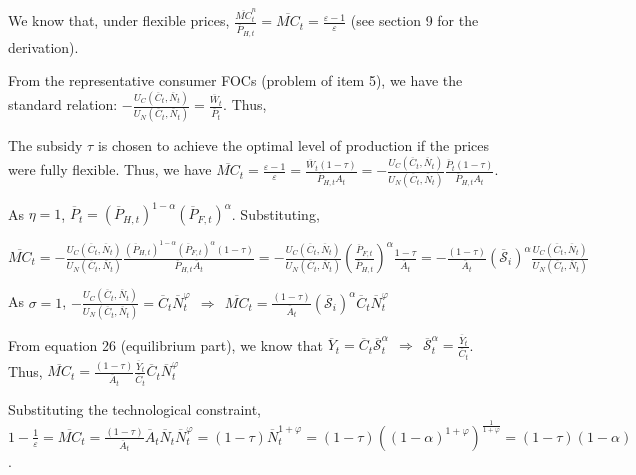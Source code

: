 \documentclass[
]{article}
\begin{document}
We know that, under flexible prices,
\(\displaystyle \frac{\overline{MC}_t^n}{\overline{P}_{H,t}}=\overline{MC}_t=\frac{\varepsilon-1}{\varepsilon}\)
(see section 9 for the derivation).

From the representative consumer FOCs (problem of item 5), we have the
standard relation:
\(\displaystyle -\frac{U_C(\overline{C}_t,\overline{N}_t)}{U_N(\overline{C}_t,\overline{N}_t)}=\frac{\overline{W}_t}{\overline{P}_t}\).
Thus,

The subsidy \(\tau\) is chosen to achieve the optimal level of
production if the prices were fully flexible. Thus, we have
\(\displaystyle \overline{MC}_t=\frac{\varepsilon-1}{\varepsilon}=\frac{\overline{W}_t (1-\tau)}{\overline{P}_{H,t} A_t}=-\frac{U_C(\overline{C}_t,\overline{N}_t)}{U_N(\overline{C}_t,\overline{N}_t)}\frac{\overline{P}_t (1-\tau)}{\overline{P}_{H,t} A_t}\).

As \(\eta=1\),
\(\overline{P}_t=(\overline{P}_{H,t})^{1-\alpha}(\overline{P}_{F,t})^\alpha\).
Substituting,

\(\displaystyle \overline{MC}_t= -\frac{U_C(\overline{C}_t,\overline{N}_t)}{U_N(\overline{C}_t,\overline{N}_t)}\frac{(\overline{P}_{H,t})^{1-\alpha}(\overline{P}_{F,t})^\alpha (1-\tau)}{\overline{P}_{H,t} \overline{A}_t}= -\frac{U_C(\overline{C}_t,\overline{N}_t)}{U_N(\overline{C}_t,\overline{N}_t)} \left( \frac{\overline{P}_{F,t}}{\overline{P}_{H,t}} \right)^\alpha \frac{1-\tau}{\overline{A}_t}= -\frac{(1-\tau)}{\overline{A}_t} (\mathcal{\overline{S}}_i)^\alpha \frac{U_C(\overline{C}_t,\overline{N}_t)}{U_N(\overline{C}_t,\overline{N}_t)}\)

As \(\sigma=1\),
\(\displaystyle -\frac{U_C(\overline{C}_t,\overline{N}_t)}{U_N(\overline{C}_t,\overline{N}_t)}=\overline{C}_t \overline{N}_t^\varphi \ \ \Rightarrow \ \ \overline{MC}_t= \frac{(1-\tau)}{\overline{A}_t} (\mathcal{\overline{S}}_i)^\alpha \overline{C}_t \overline{N}_t^\varphi\)

From equation 26 (equilibrium part), we know that
\(\displaystyle \overline{Y}_t=\overline{C}_t \mathcal{\overline{S}}_t^\alpha \ \ \Rightarrow \ \  \mathcal{\overline{S}}_t^\alpha = \frac{\overline{Y}_t}{\overline{C}_t}\).
Thus,
\(\displaystyle \overline{MC}_t= \frac{(1-\tau)}{\overline{A}_t} \frac{\overline{Y}_t}{\overline{C}_t} \overline{C}_t \overline{N}_t^\varphi\)

Substituting the technological constraint,
\(\displaystyle 1-\frac{1}{\varepsilon}=\overline{MC}_t= \frac{(1-\tau)}{\overline{A}_t} \overline{A}_t \overline{N}_t \overline{N}_t^\varphi=(1-\tau) \overline{N}_t^{1+\varphi}=(1-\tau)\left( (1-\alpha)^{1+\varphi} \right)^{\frac{1}{1+\varphi}}=(1-\tau)(1-\alpha)\).
\end{document}
